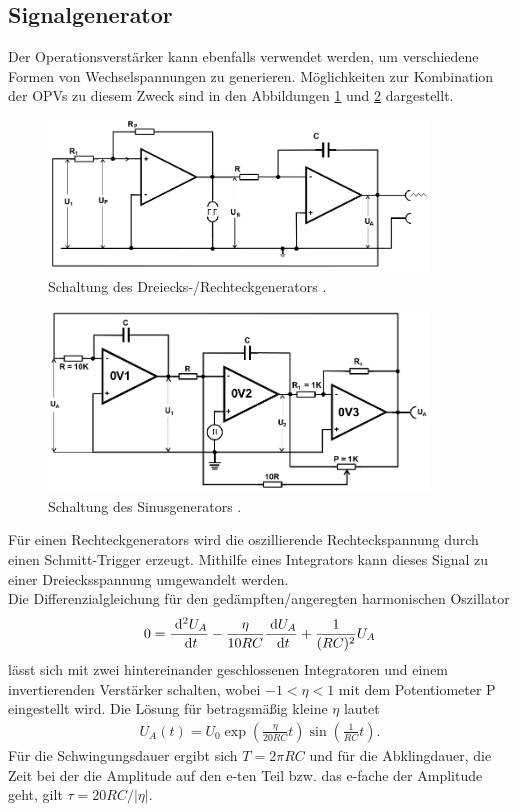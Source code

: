 \subsection{Signalgenerator}
Der Operationsverstärker kann ebenfalls verwendet werden, um verschiedene Formen
von Wechselspannungen zu generieren. Möglichkeiten zur Kombination der OPVs 
zu diesem Zweck sind in den Abbildungen \ref{pic:dreiRect}
und \ref{pic:sinus} dargestellt.
\begin{figure}[t]
 \includegraphics[width = 0.9\textwidth]{../pics/DreiRect.png}
 \caption{Schaltung des Dreiecks-/Rechteckgenerators \cite{Anl}.}
 \label{pic:dreiRect}
\end{figure}
\begin{figure}[t]
 \includegraphics[width = 0.9\textwidth]{../pics/sinus.png}
 \caption{Schaltung des Sinusgenerators \cite{Anl}.}
 \label{pic:sinus}
\end{figure}
Für einen Rechteckgenerators wird die oszillierende Rechteckspannung durch einen
Schmitt-Trigger erzeugt. Mithilfe eines Integrators kann dieses Signal 
zu einer Dreiecksspannung umgewandelt werden.\\
\noindent Die Differenzialgleichung für den gedämpften/angeregten
harmonischen Oszillator
\begin{align}
 0 = \frac{\; \mathrm{d}^2 U_A}{\; \mathrm{d} t}- \frac{\eta}{10 RC} \frac{\; \mathrm{d} U_A}{\; \mathrm{d} t} + \frac{1}{(RC)^2}U_A
\end{align}
lässt sich mit zwei hintereinander geschlossenen Integratoren und einem invertierenden
Verstärker schalten, wobei $-1<\eta<1$ mit dem Potentiometer P eingestellt wird. Die Lösung
für betragsmäßig kleine $\eta$ lautet
\begin{align}
 U_A(t) = U_0 \exp\left(\frac{\eta}{20RC}t\right) \sin\left(\frac{1}{RC}t\right).
 \label{eq:sinusGen}
\end{align}
Für die Schwingungsdauer ergibt sich $T=2\pi RC$ und für die Abklingdauer,
die Zeit bei der die Amplitude auf den e-ten Teil bzw. das e-fache der Amplitude geht,
gilt $\tau = 20RC/|\eta|$.

